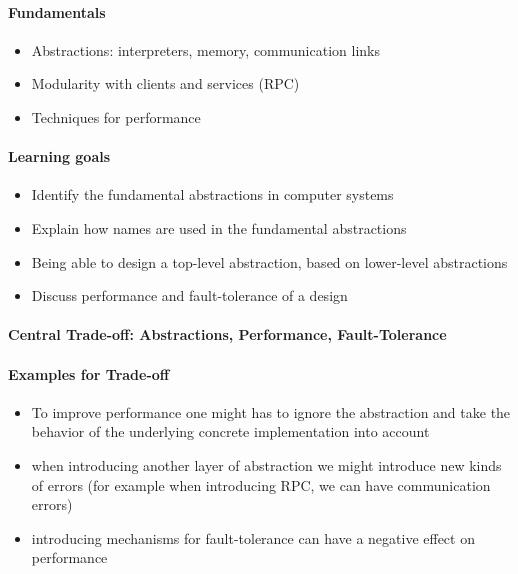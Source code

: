 \paragraph{Fundamentals}
\begin{itemize}
\item Abstractions: interpreters, memory, communication links
\item Modularity with clients and services (RPC)
\item Techniques for performance
\end{itemize}

\paragraph{Learning goals}
\begin{itemize}
\item Identify the fundamental abstractions in
  computer systems
\item Explain how names are used in the fundamental abstractions
\item Being able to design a top-level abstraction, based on
  lower-level abstractions
\item Discuss performance and fault-tolerance of a design
\end{itemize}

\paragraph{Central Trade-off: Abstractions, Performance, Fault-Tolerance}
\begin{figure}[ht!]
  \centering
\end{figure}

\paragraph{Examples for Trade-off}
\begin{itemize}
\item To improve performance one might has to ignore the abstraction
  and take the behavior of the underlying concrete implementation into
  account
\item when introducing another layer of abstraction we might
  introduce new kinds of errors (for example when introducing RPC,
  we can have communication errors)
\item introducing mechanisms for fault-tolerance can have
  a negative effect on performance
\end{itemize}


